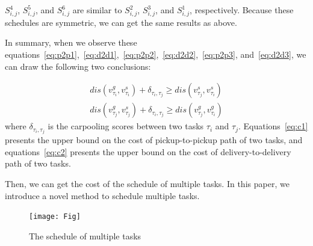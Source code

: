 \documentclass[sigconf,anonymous]{aamas}
\begin{document}
$S^4_{i,j}$, $S^5_{i,j}$, and $S^6_{i,j}$ are similar to $S^2_{i,j}$, $S^3_{i,j}$, and $S^1_{i,j}$, respectively.
Because these schedules are symmetric, we can get the same results as above.

In summary,
when we observe these equations~\ref{eq:p2p1},~\ref{eq:d2d1},~\ref{eq:p2p2},~\ref{eq:d2d2},~\ref{eq:p2p3}, and~\ref{eq:d2d3},
we can draw the following two conclusions:

\begin{eqnarray}
    \label{eq:conclusion1}
    dis(v^g_{\tau_i}, v^s_{\tau_i}) + \delta_{\tau_i, \tau_j} \geq dis(v^s_{\tau_j}, v^s_{\tau_i}) \label{eq:c1} \\
    dis(v^g_{\tau_j}, v^s_{\tau_j}) + \delta_{\tau_i, \tau_j} \geq dis(v^g_{\tau_j}, v^g_{\tau_i}) \label{eq:c2}
\end{eqnarray}
where $\delta_{\tau_i, \tau_j}$ is the carpooling scores between two tasks $\tau_i$ and $\tau_j$.
Equations~\ref{eq:c1} presents the upper bound on the cost of pickup-to-pickup path of two tasks,
and equations~\ref{eq:c2} presents the upper bound on the cost of delivery-to-delivery path of two tasks.

Then, we can get the cost of the schedule of multiple tasks.
In this paper, we introduce a novel method to schedule multiple tasks.

\begin{figure}
    \centering
    \texttt{[image: Fig]}
    \caption{The schedule of multiple tasks}
    \label{fig:smt}
\end{figure}


\balance




%  
% 

\end{document}
